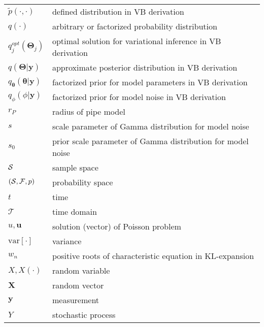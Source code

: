 \begin{longtable}{p{4cm} l}
  $\tilde{p}(\cdot,\cdot)$ & defined distribution in VB derivation \\
  $q(\cdot)$ & arbitrary or factorized probability distribution \\
  $q^{opt}_j(\bm{\Theta}_j)$ & optimal solution for variational inference in VB derivation \\
  $q(\bm{\Theta}|\bm{y})$ & approximate posterior distribution in VB derivation \\
  $q_{\bm{\theta}}(\bm{\theta}|\bm{y})$ & factorized prior for model parameters in VB derivation \\
  $q_{\phi}(\phi|\bm{y})$ & factorized prior for model noise in VB derivation \\
  $r_P$ & radius of pipe model \\
  $s$ & scale parameter of Gamma distribution for model noise \\
  $s_0$ & prior scale parameter of Gamma distribution for model noise \\
  $\mathcal{S}$ & sample space \\
  $(\mathcal{S},\mathcal{F},p)$ & probability space \\
  $t$ & time \\
  $\mathcal{T}$ & time domain \\
  $u, \bm{u}$ & solution (vector) of Poisson problem \\
  $\text{var}[\cdot]$ & variance \\
  $w_n$ & positive roots of characteristic equation in KL-expansion \\
  $X, X(\cdot)$ & random variable \\
  $\bm{X}$ & random vector \\
  $\bm{y}$ & measurement \\
  $Y$ & stochastic process \\
\end{longtable}

